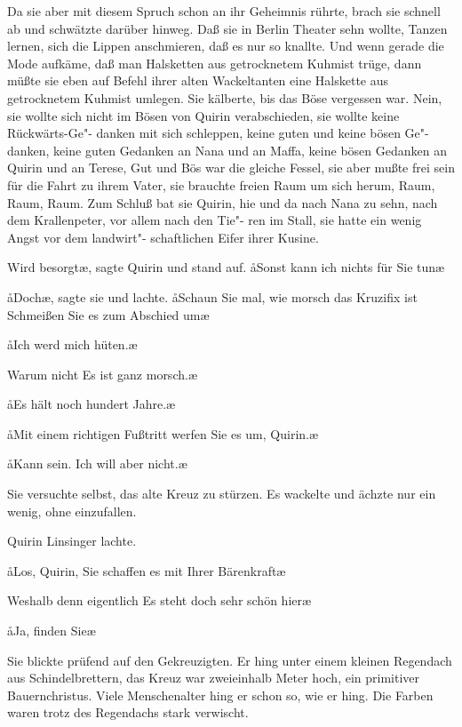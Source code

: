 Da sie aber mit diesem Spruch schon an ihr Geheimnis rührte,
brach sie schnell ab und schwätzte darüber hinweg. Daß sie in
Berlin Theater sehn wollte, Tanzen lernen, sich die Lippen
anschmieren, daß es nur so knallte. Und wenn gerade die Mode
aufkäme, daß man Halsketten aus getrocknetem Kuhmist trüge,
dann müßte sie eben auf Befehl ihrer alten Wackeltanten eine
Halskette aus getrocknetem Kuhmist umlegen. Sie kälberte,
bis das Böse vergessen war. Nein, sie wollte sich nicht im Bösen
von Quirin verabschieden, sie wollte keine Rückwärts-Ge"-%
danken mit sich schleppen, keine guten und keine bösen Ge"-%
danken, keine guten Gedanken an Nana und an Maffa, keine
bösen Gedanken an Quirin und an Terese, Gut und Bös war
die gleiche Fessel, sie aber mußte frei sein für die Fahrt zu
ihrem Vater, sie brauchte freien Raum um sich herum, Raum,
Raum, Raum. Zum Schluß bat sie Quirin, hie und da nach
Nana zu sehn, nach dem Krallenpeter, vor allem nach den Tie"-%
ren im Stall, sie hatte ein wenig Angst vor dem landwirt"-%
schaftlichen Eifer ihrer Kusine.

\aanah{}Wird besorgt\ae{}, sagte Quirin und stand auf. \aa{}Sonst kann ich
nichts für Sie tun\frag{}\ae{}

\aa{}Doch\ae{}, sagte sie und lachte. \aa{}Schaun Sie mal, wie morsch
das Kruzifix ist\ausr{} Schmeißen Sie es zum Abschied um\ausr{}\ae{}

\aa{}Ich werd mich hüten.\ae{}

\aanah{}Warum nicht\frag{} Es ist ganz morsch.\ae{}

\aa{}Es hält noch hundert Jahre.\ae{}

\aa{}Mit einem richtigen Fußtritt werfen Sie es um, Quirin.\ae{}

\aa{}Kann sein. Ich will aber nicht.\ae{}

Sie versuchte selbst, das alte Kreuz zu stürzen. Es wackelte
und ächzte nur ein wenig, ohne einzufallen.

Quirin Linsinger lachte.

\aa{}Los, Quirin, Sie schaffen es mit Ihrer Bärenkraft\ausr{}\ae{}

\aanah{}Weshalb denn eigentlich\frag{} Es steht doch sehr schön hier\frag{}\ae{}

\aa{}Ja, finden Sie\frag{}\ae{}

Sie blickte prüfend auf den Gekreuzigten. Er hing unter einem
kleinen Regendach aus Schindelbrettern, das Kreuz war
zweieinhalb Meter hoch, ein primitiver Bauernchristus. Viele
Menschenalter hing er schon so, wie er hing. Die Farben
waren trotz des Regendachs stark verwischt.

